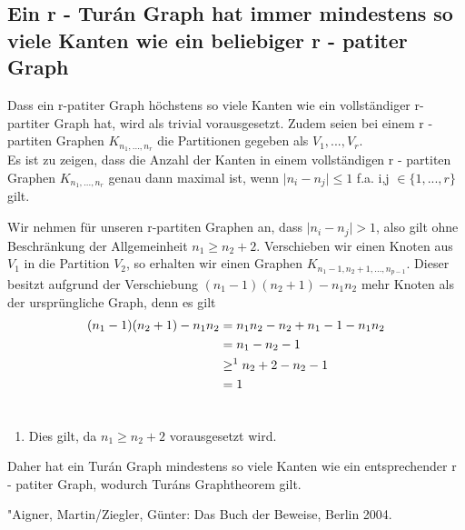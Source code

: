 \documentclass[12pt, a4paper]{article}
\begin{document}
\subsection{Ein r - Turán Graph hat immer mindestens so viele Kanten wie ein beliebiger  r - patiter Graph}
Dass ein r-patiter Graph höchstens so viele Kanten wie ein vollständiger r-partiter Graph hat, wird als trivial vorausgesetzt. Zudem seien bei einem r - partiten Graphen $K_{n_1,...,n_r}$  die Partitionen gegeben als $V_1, ..., V_r$. \\
Es ist zu zeigen, dass die Anzahl der Kanten in einem vollständigen r - partiten Graphen $K_{n_1,...,n_r}$ genau dann maximal ist, wenn $\mid n_i - n_j \mid \le 1$ f.a. i,j $\in \{1, ...,  r \}$ gilt.

Wir nehmen für unseren r-partiten Graphen an, dass $\mid n_i - n_j \mid > 1$, also gilt ohne Beschränkung der Allgemeinheit $n_1 \ge n_2 + 2$.
Verschieben wir einen Knoten aus $V_1$ in die Partition $V_2$, so erhalten wir einen Graphen $K_{n_1 - 1, n_2 + 1,...,n_{p - 1}}$. Dieser besitzt aufgrund der Verschiebung $(n_1 - 1)(n_2 + 1) - n_1 n_2$ mehr Knoten als der ursprüngliche Graph, denn es gilt
\begin{gather}
\begin{split}(n_1 - 1)(n_2 + 1) - n_1 n_2 &= n_1 n_2 - n_2 + n_1 - 1 - n_1 n_2 \\
&= n_1 - n_2 - 1 \\
&\ge^1 n_2 + 2 - n_2 - 1 \\
&= 1\end{split}\notag\\\begin{split}\end{split}\notag
\end{gather}\begin{enumerate}
\item {}
Dies gilt, da $n_1 \ge n_2 + 2$ vorausgesetzt wird.

\end{enumerate}

Daher hat ein Turán Graph mindestens so viele Kanten wie ein entsprechender r - patiter Graph, wodurch Turáns Graphtheorem gilt.

\begin{thebibliography}{laengste Breite}
\bibitem "Aigner, Martin/Ziegler, Günter: Das Buch der Beweise, Berlin 2004.
\end{thebibliography}
\end{document}
